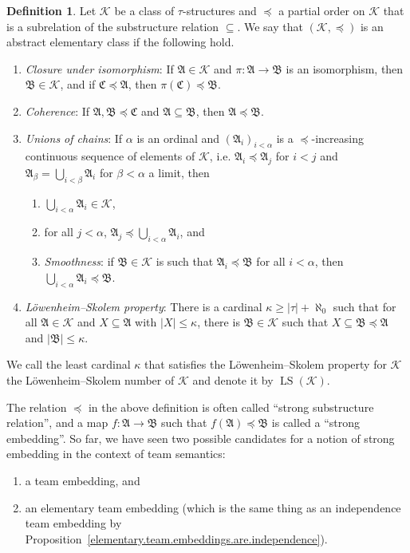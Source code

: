 \documentclass[a4paper]{amsart}
\theoremstyle{definition}
\newtheorem{definition}{Definition}[section]
\theoremstyle{remark}
\newcommand{\A}{\mathcal{A}}
\newcommand{\B}{\mathcal{B}}
\newcommand{\C}{\mathcal{C}}
\newcommand{\K}{\mathcal{K}}
\DeclareMathOperator{\LS}{LS}
\theoremstyle{definition}
\renewcommand{\A}{\mathfrak{A}}
\renewcommand{\B}{\mathfrak{B}}
\renewcommand{\C}{\mathfrak{C}}
\begin{document}
\begin{definition}
    Let $\K$ be a class of $\tau$-structures and $\preceq$ a partial order on $\K$ that is a subrelation of the substructure relation $\subseteq$. We say that $(\K,\preceq)$ is an abstract elementary class if the following hold.
    \begin{enumerate}
        \item \emph{Closure under isomorphism}: If $\A\in\K$ and $\pi\colon\A\to\B$ is an isomorphism, then $\B\in\K$, and if $\C\preceq\A$, then $\pi(\C)\preceq\B$.
        \item \emph{Coherence}: If $\A,\B\preceq\C$ and $\A\subseteq\B$, then $\A\preceq\B$.
        \item \emph{Unions of chains}: If $\alpha$ is an ordinal and $(\A_i)_{i<\alpha}$ is a $\preceq$-increasing continuous sequence of elements of $\K$, i.e. $\A_i\preceq\A_j$ for $i<j$ and $\A_\beta = \bigcup_{i<\beta}\A_i$ for $\beta<\alpha$ a limit, then
        \begin{enumerate}
            \item $\bigcup_{i<\alpha}\A_i\in\K$,
            \item for all $j<\alpha$, $\A_j\preceq\bigcup_{i<\alpha}\A_i$, and
            \item \emph{Smoothness}: if $\B\in\K$ is such that $\A_i\preceq\B$ for all $i<\alpha$, then $\bigcup_{i<\alpha}\A_i\preceq\B$.
        \end{enumerate}
        \item \emph{Löwenheim--Skolem property}: There is a cardinal $\kappa\geq|\tau|+\aleph_0$ such that for all $\A\in\K$ and $X\subseteq\A$ with $|X|\leq \kappa$, there is $\B\in\K$ such that $X\subseteq\B\preceq\A$ and $|\B|\leq\kappa$.
    \end{enumerate}
\end{definition}

\noindent We call the least cardinal $\kappa$ that satisfies the Löwenheim--Skolem property for $\K$ the Löwenheim--Skolem number of $\K$ and denote it by $\LS(\K)$.

The relation $\preceq$ in the above definition is often called ``strong substructure relation'', and a map $f\colon\A\to\B$ such that $f(\A)\preceq\B$ is called a ``strong embedding''. So far, we have seen two possible candidates for a notion of strong embedding in the context of team semantics:
\begin{enumerate}
    \item a team embedding, and
    \item an elementary team embedding (which is the same thing as an independence team embedding by Proposition~\ref{elementary.team.embeddings.are.independence}).
\end{enumerate}
\end{document}
